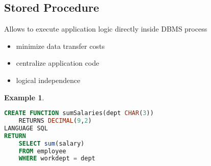 \documentclass[]{article}
\theoremstyle{definition}
\newtheorem{ex}{Example}[section]
\begin{document}
		\subsection{Stored Procedure}
			Allows to execute application logic directly inside DBMS process
			\begin{itemize}
				\item minimize data transfer costs
				\item centralize application code
				\item logical independence
			\end{itemize}
			\begin{ex}
				\begin{lstlisting}[language=SQL]
CREATE FUNCTION sumSalaries(dept CHAR(3))
	RETURNS DECIMAL(9,2)
LANGUAGE SQL
RETURN
	SELECT sum(salary)
	FROM employee
	WHERE workdept = dept
				\end{lstlisting}
			\end{ex}
\end{document}
